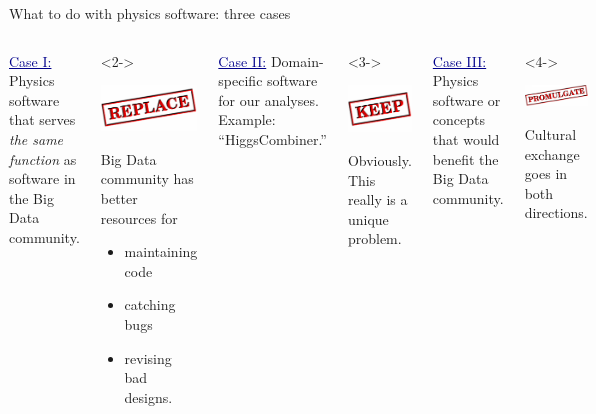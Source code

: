 \documentclass[aspectratio=169]{beamer}
\begin{document}
\begin{frame}{What to do with physics software: three cases}
\vspace{0.25 cm}
\begin{columns}[t]
\textcolor{darkblue}{\underline{Case I:}} Physics software that serves {\it the same function} as software in the Big Data community.

\begin{uncoverenv}<2->
\begin{center}
\includegraphics[height=1.5 cm]{stamp_replace.png}
\end{center}

Big Data community has better resources for
\begin{itemize}
\item maintaining code
\item catching bugs
\item revising bad designs.
\end{itemize}
\end{uncoverenv}

\textcolor{darkblue}{\underline{Case II:}} Domain-specific software for our analyses. Example: ``HiggsCombiner.'' \mbox{\hspace{1 cm}}

\begin{uncoverenv}<3->
\begin{center}
\includegraphics[height=1.5 cm]{stamp_keep.png}
\end{center}

Obviously. This really is a unique problem.
\end{uncoverenv}

\textcolor{darkblue}{\underline{Case III:}} Physics software or concepts that would benefit the Big Data community. \\ \mbox{ }

\begin{uncoverenv}<4->
\begin{center}
\includegraphics[height=1.5 cm]{stamp_promulgate.png}
\end{center}

Cultural exchange goes in both directions.
\end{uncoverenv}
\end{columns}
\end{frame}
\end{document}
